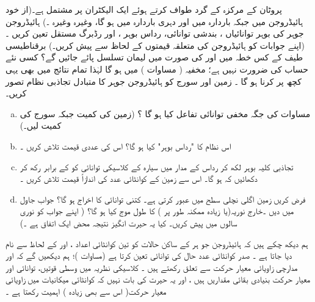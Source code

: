    پروٹان  کے مرکزہ کے گرد طواف کرتے ہوئے  ایک  الیکٹران  پر مشتمل  ہے۔(از  خود ہائیڈروجن  میں      جبکہ    باردارہ  میں   اور دہری باردارہ    میں    ہو گا،  وغیرہ وغیرہ ۔)   ہائیڈروجن  جوہر کی بوہر  توانائیاں  ،  بندشی  توانائی،   رداس بوہر  ،  اور رڈبرگ  مستقل  
 تعین کریں ۔ (اپنے جوابات کو  ہائیڈروجن  کی متعلقہ قیمتوں کے لحاظ سے پیش کریں۔)   برقناطیسی طیف کے کس خطہ میں   اور   کی صورت میں   لیمان   تسلسل پائے جائیں گے؟    کسی نئے   حساب کی ضرورت نہیں ہے؛   مخفیہ (  مساوات )   میں    ہو گا لہٰذا تمام  نتائج میں بھی یہی کچھ پر کرنا  ہو  گا  ۔
زمین اور سورج کو ہائیڈروجن  جوہر کا متبادل تجاذبی نظام تصور کریں۔
\begin{enumerate}[a.]
\item
 مساوات    کی جگہ مخفی توانائی تفاعل کیا  ہو گا ؟  (زمین کی کمیت   جبکہ سورج کی کمیت  لیں۔)
\item
اس نظام کا   "رداس بوہر"    کیا ہو گا؟ اس کی عددی قیمت تلاش کریں ۔
\item
تجاذبی کلیہ  بوہر  لکھ کر  رداس   کے مدار میں سیارہ  کے کلاسیکی توانائی کو   کے برابر رکھ کر  دکھائیں کہ  ہو گا۔ اس سے زمین کے کوانٹائی  عدد  کی اندازاً قیمت تلاش کریں ۔
\item
فرض کریں  زمین  اگلی نچلی سطح    میں عبور کرتی  ہے۔  کتنی توانائی  کا اخراج ہو گا؟  جواب   جاول   میں دیں ۔خارج   نوریہ(یا   زیادہ ممکنہ طور پر )   کا طول موج کیا ہو گا؟ ( اپنے جواب کو نوری سالوں میں پیش کریں۔ کیا یہ حیرت انگیز  نتیجہ محض ایک اتفاق ہے ۔)
\end{enumerate}

ہم دیکھ چکے ہیں کہ ہائیڈروجن جو ہر کے ساکن حالات کو تین کوانٹائی اعداد ،   اور  کے لحاظ سے نام دیا جاتا ہے ۔ صدر کوانٹائی عدد   حال کی توانائی تعین کرتا ہے  (مساوات  )؛  ہم دیکھیں گے کہ  اور  مدارچی زاویائی معیار حرکت سے تعلق رکھتے ہیں ۔ کلاسیکی نظریہ میں وسطی قوتیں،  توانائی اور معیار حرکت بنیادی بقائی مقداریں ہیں ،  اور یہ حیرت کی  بات نہیں  کہ کوانٹائی میکانیات میں  زاویائی معیار حرکت( اس سے بھی زیادہ ) اہمیت  رکھتا ہے ۔

